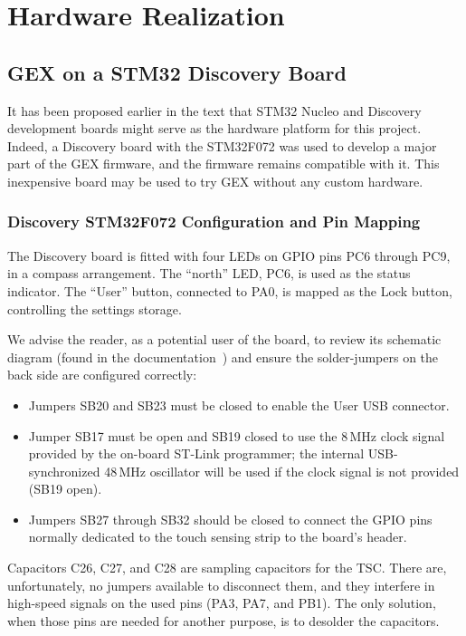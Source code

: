 \chapter{Hardware Realization} \label{sec:hwreal}

\section{GEX on a STM32 Discovery Board}

It has been proposed earlier in the text that STM32 Nucleo and Discovery development boards might serve as the hardware platform for this project. Indeed, a Discovery board with the STM32F072 was used to develop a major part of the GEX firmware, and the firmware remains compatible with it. This inexpensive board may be used to try GEX without any custom hardware.

\subsection{Discovery STM32F072 Configuration and Pin Mapping}

The Discovery board is fitted with four \glspl{LED} on \gls{GPIO} pins PC6 through PC9, in a compass arrangement. The ``north'' \gls{LED}, PC6, is used as the status indicator. The ``User'' button, connected to PA0, is mapped as the Lock button, controlling the settings storage.

We advise the reader, as a potential user of the board, to review its schematic diagram (found in the documentation~\cite{disco-f072}) and ensure the solder-jumpers on the back side are configured correctly:

\begin{itemize}
	\item Jumpers SB20 and SB23 must be closed to enable the User \gls{USB} connector.
	
	\item Jumper SB17 must be open and SB19 closed to use the 8\,MHz clock signal provided by the on-board ST-Link programmer; the internal USB-synchronized 48\,MHz oscillator will be used if the clock signal is not provided (SB19 open).
	
	\item Jumpers SB27 through SB32 should be closed to connect the \gls{GPIO} pins normally dedicated to the touch sensing strip to the board's header.
\end{itemize} 

Capacitors C26, C27, and C28 are sampling capacitors for the \gls{TSC}. There are, unfortunately, no jumpers available to disconnect them, and they interfere in high-speed signals on the used pins (PA3, PA7, and PB1). The only solution, when those pins are needed for another purpose, is to desolder the capacitors.

